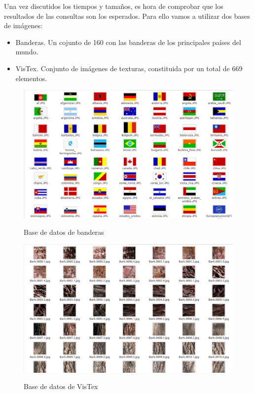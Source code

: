 Una vez discutidos los tiempos y tamaños, es hora de comprobar que los resultados de las consultas son los esperados. Para ello vamos a utilizar dos bases de imágenes:\\

\begin{itemize}

\item Banderas. Un cojunto de 160 con las banderas de los principales países del mundo.

\item VisTex. Conjunto de imágenes de texturas, constituida por un total de 669 elementos.

\end{itemize}

\begin{figure}[H] %
\centering
\includegraphics[scale=0.5]{imagenes/banderas.png}  %
\label{banderas}
\caption{Base de datos de banderas}
\end{figure}

\begin{figure}[H] %
\centering
\includegraphics[scale=0.5]{imagenes/texturas.png}  %
\label{texturas}
\caption{Base de datos de VisTex}
\end{figure}

